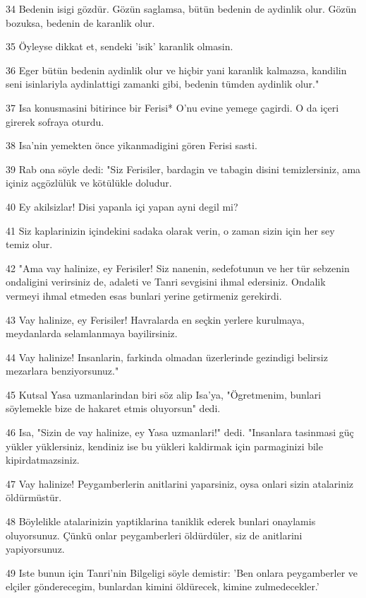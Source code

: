 \par 34 Bedenin isigi gözdür. Gözün saglamsa, bütün bedenin de aydinlik olur. Gözün bozuksa, bedenin de karanlik olur.
\par 35 Öyleyse dikkat et, sendeki 'isik' karanlik olmasin.
\par 36 Eger bütün bedenin aydinlik olur ve hiçbir yani karanlik kalmazsa, kandilin seni isinlariyla aydinlattigi zamanki gibi, bedenin tümden aydinlik olur."
\par 37 Isa konusmasini bitirince bir Ferisi* O'nu evine yemege çagirdi. O da içeri girerek sofraya oturdu.
\par 38 Isa'nin yemekten önce yikanmadigini gören Ferisi sasti.
\par 39 Rab ona söyle dedi: "Siz Ferisiler, bardagin ve tabagin disini temizlersiniz, ama içiniz açgözlülük ve kötülükle doludur.
\par 40 Ey akilsizlar! Disi yapanla içi yapan ayni degil mi?
\par 41 Siz kaplarinizin içindekini sadaka olarak verin, o zaman sizin için her sey temiz olur.
\par 42 "Ama vay halinize, ey Ferisiler! Siz nanenin, sedefotunun ve her tür sebzenin ondaligini verirsiniz de, adaleti ve Tanri sevgisini ihmal edersiniz. Ondalik vermeyi ihmal etmeden esas bunlari yerine getirmeniz gerekirdi.
\par 43 Vay halinize, ey Ferisiler! Havralarda en seçkin yerlere kurulmaya, meydanlarda selamlanmaya bayilirsiniz.
\par 44 Vay halinize! Insanlarin, farkinda olmadan üzerlerinde gezindigi belirsiz mezarlara benziyorsunuz."
\par 45 Kutsal Yasa uzmanlarindan biri söz alip Isa'ya, "Ögretmenim, bunlari söylemekle bize de hakaret etmis oluyorsun" dedi.
\par 46 Isa, "Sizin de vay halinize, ey Yasa uzmanlari!" dedi. "Insanlara tasinmasi güç yükler yüklersiniz, kendiniz ise bu yükleri kaldirmak için parmaginizi bile kipirdatmazsiniz.
\par 47 Vay halinize! Peygamberlerin anitlarini yaparsiniz, oysa onlari sizin atalariniz öldürmüstür.
\par 48 Böylelikle atalarinizin yaptiklarina taniklik ederek bunlari onaylamis oluyorsunuz. Çünkü onlar peygamberleri öldürdüler, siz de anitlarini yapiyorsunuz.
\par 49 Iste bunun için Tanri'nin Bilgeligi söyle demistir: 'Ben onlara peygamberler ve elçiler gönderecegim, bunlardan kimini öldürecek, kimine zulmedecekler.'
